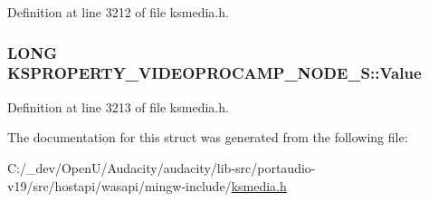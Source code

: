 Definition at line 3212 of file ksmedia.\+h.

\subsubsection[{\texorpdfstring{Value}{Value}}]{\setlength{\rightskip}{0pt plus 5cm}L\+O\+NG K\+S\+P\+R\+O\+P\+E\+R\+T\+Y\+\_\+\+V\+I\+D\+E\+O\+P\+R\+O\+C\+A\+M\+P\+\_\+\+N\+O\+D\+E\+\_\+\+S\+::\+Value}\hypertarget{struct_k_s_p_r_o_p_e_r_t_y___v_i_d_e_o_p_r_o_c_a_m_p___n_o_d_e___s_aa549c657a4d4c87abfab570f3e94f953}{}\label{struct_k_s_p_r_o_p_e_r_t_y___v_i_d_e_o_p_r_o_c_a_m_p___n_o_d_e___s_aa549c657a4d4c87abfab570f3e94f953}


Definition at line 3213 of file ksmedia.\+h.



The documentation for this struct was generated from the following file\+:\begin{DoxyCompactItemize}
\item 
C\+:/\+\_\+dev/\+Open\+U/\+Audacity/audacity/lib-\/src/portaudio-\/v19/src/hostapi/wasapi/mingw-\/include/\hyperlink{ksmedia_8h}{ksmedia.\+h}\end{DoxyCompactItemize}
